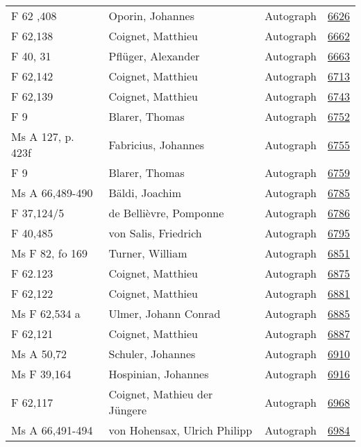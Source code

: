 \documentclass[10pt,a4paper,landscape]{report}
\begin{document}
\begin{longtable}{p{16cm}p{4cm}lr}
F 62 ,408	&	Oporin, Johannes	&	Autograph	&	\href{http://130.60.24.72/assignment/6626}{6626}\\
F 62,138	&	Coignet, Matthieu	&	Autograph	&	\href{http://130.60.24.72/assignment/6662}{6662}\\
F 40, 31	&	Pflüger, Alexander	&	Autograph	&	\href{http://130.60.24.72/assignment/6663}{6663}\\
F 62,142	&	Coignet, Matthieu	&	Autograph	&	\href{http://130.60.24.72/assignment/6713}{6713}\\
F 62,139	&	Coignet, Matthieu	&	Autograph	&	\href{http://130.60.24.72/assignment/6743}{6743}\\
F 9	&	Blarer, Thomas	&	Autograph	&	\href{http://130.60.24.72/assignment/6752}{6752}\\
Ms A 127, p. 423f	&	Fabricius, Johannes	&	Autograph	&	\href{http://130.60.24.72/assignment/6755}{6755}\\
F 9	&	Blarer, Thomas	&	Autograph	&	\href{http://130.60.24.72/assignment/6759}{6759}\\
Ms A 66,489-490	&	Bäldi, Joachim	&	Autograph	&	\href{http://130.60.24.72/assignment/6785}{6785}\\
F 37,124/5	&	de Bellièvre, Pomponne	&	Autograph	&	\href{http://130.60.24.72/assignment/6786}{6786}\\
F 40,485	&	von Salis, Friedrich	&	Autograph	&	\href{http://130.60.24.72/assignment/6795}{6795}\\
Ms F 82, fo 169	&	Turner, William	&	Autograph	&	\href{http://130.60.24.72/assignment/6851}{6851}\\
F 62.123	&	Coignet, Matthieu	&	Autograph	&	\href{http://130.60.24.72/assignment/6875}{6875}\\
F 62,122	&	Coignet, Matthieu	&	Autograph	&	\href{http://130.60.24.72/assignment/6881}{6881}\\
Ms F 62,534 a	&	Ulmer, Johann Conrad	&	Autograph	&	\href{http://130.60.24.72/assignment/6885}{6885}\\
F 62,121	&	Coignet, Matthieu	&	Autograph	&	\href{http://130.60.24.72/assignment/6887}{6887}\\
Ms A 50,72	&	Schuler, Johannes	&	Autograph	&	\href{http://130.60.24.72/assignment/6910}{6910}\\
Ms F 39,164	&	Hospinian, Johannes	&	Autograph	&	\href{http://130.60.24.72/assignment/6916}{6916}\\
F 62,117	&	Coignet, Mathieu der Jüngere	&	Autograph	&	\href{http://130.60.24.72/assignment/6968}{6968}\\
Ms A 66,491-494	&	von Hohensax, Ulrich Philipp	&	Autograph	&	\href{http://130.60.24.72/assignment/6984}{6984}\\

\end{longtable}
\end{document}
